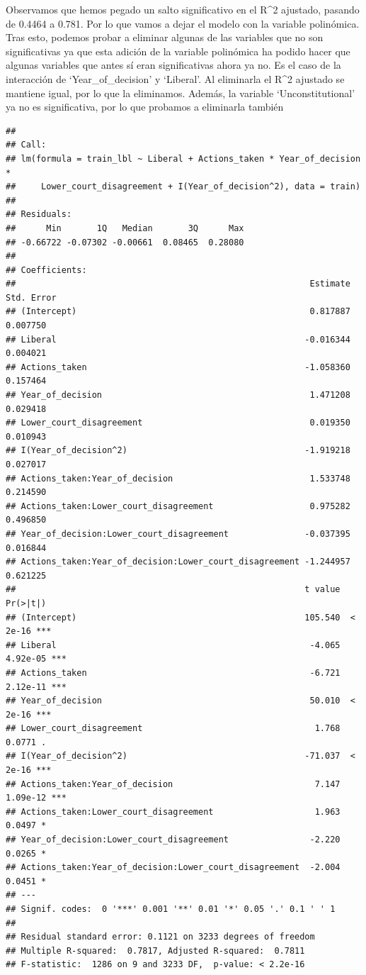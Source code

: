 \documentclass[
]{article}
\begin{document}
Observamos que hemos pegado un salto significativo en el R\^{}2
ajustado, pasando de 0.4464 a 0.781. Por lo que vamos a dejar el modelo
con la variable polinómica. Tras esto, podemos probar a eliminar algunas
de las variables que no son significativas ya que esta adición de la
variable polinómica ha podido hacer que algunas variables que antes sí
eran significativas ahora ya no. Es el caso de la interacción de
`Year\_of\_decision' y `Liberal'. Al eliminarla el R\^{}2 ajustado se
mantiene igual, por lo que la eliminamos. Además, la variable
`Unconstitutional' ya no es significativa, por lo que probamos a
eliminarla también

\begin{verbatim}
## 
## Call:
## lm(formula = train_lbl ~ Liberal + Actions_taken * Year_of_decision * 
##     Lower_court_disagreement + I(Year_of_decision^2), data = train)
## 
## Residuals:
##      Min       1Q   Median       3Q      Max 
## -0.66722 -0.07302 -0.00661  0.08465  0.28080 
## 
## Coefficients:
##                                                          Estimate Std. Error
## (Intercept)                                              0.817887   0.007750
## Liberal                                                 -0.016344   0.004021
## Actions_taken                                           -1.058360   0.157464
## Year_of_decision                                         1.471208   0.029418
## Lower_court_disagreement                                 0.019350   0.010943
## I(Year_of_decision^2)                                   -1.919218   0.027017
## Actions_taken:Year_of_decision                           1.533748   0.214590
## Actions_taken:Lower_court_disagreement                   0.975282   0.496850
## Year_of_decision:Lower_court_disagreement               -0.037395   0.016844
## Actions_taken:Year_of_decision:Lower_court_disagreement -1.244957   0.621225
##                                                         t value Pr(>|t|)    
## (Intercept)                                             105.540  < 2e-16 ***
## Liberal                                                  -4.065 4.92e-05 ***
## Actions_taken                                            -6.721 2.12e-11 ***
## Year_of_decision                                         50.010  < 2e-16 ***
## Lower_court_disagreement                                  1.768   0.0771 .  
## I(Year_of_decision^2)                                   -71.037  < 2e-16 ***
## Actions_taken:Year_of_decision                            7.147 1.09e-12 ***
## Actions_taken:Lower_court_disagreement                    1.963   0.0497 *  
## Year_of_decision:Lower_court_disagreement                -2.220   0.0265 *  
## Actions_taken:Year_of_decision:Lower_court_disagreement  -2.004   0.0451 *  
## ---
## Signif. codes:  0 '***' 0.001 '**' 0.01 '*' 0.05 '.' 0.1 ' ' 1
## 
## Residual standard error: 0.1121 on 3233 degrees of freedom
## Multiple R-squared:  0.7817, Adjusted R-squared:  0.7811 
## F-statistic:  1286 on 9 and 3233 DF,  p-value: < 2.2e-16
\end{verbatim}
\end{document}
